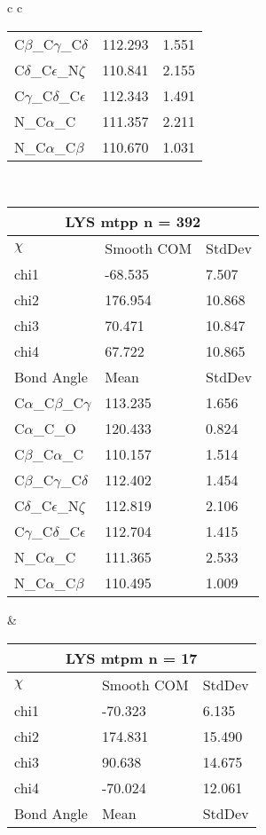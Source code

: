 \begin{longtable}{ c c }
\begin{tabular}{ l l l }
  C$\beta$\_C$\gamma$\_C$\delta$ & 112.293 & 1.551\\
  C$\delta$\_C$\epsilon$\_N$\zeta$ & 110.841 & 2.155\\
  C$\gamma$\_C$\delta$\_C$\epsilon$ & 112.343 & 1.491\\
  N\_C$\alpha$\_C & 111.357 & 2.211\\
  N\_C$\alpha$\_C$\beta$ & 110.670 & 1.031\\
  \bottomrule
  \end{tabular}
  \\
  \begin{tabular}{ l l l }
  \toprule
  \multicolumn{3}{c}{LYS \textbf{mtpp} n = 392} \\ \toprule
  $\chi$       & Smooth COM & StdDev \\ \midrule
  chi1 & -68.535 & 7.507 \\ 
  chi2 & 176.954 & 10.868 \\ 
  chi3 & 70.471 & 10.847 \\ 
  chi4 & 67.722 & 10.865 \\ \midrule
  Bond Angle   & Mean     & StdDev \\ \midrule
  C$\alpha$\_C$\beta$\_C$\gamma$ & 113.235 & 1.656\\
  C$\alpha$\_C\_O & 120.433 & 0.824\\
  C$\beta$\_C$\alpha$\_C & 110.157 & 1.514\\
  C$\beta$\_C$\gamma$\_C$\delta$ & 112.402 & 1.454\\
  C$\delta$\_C$\epsilon$\_N$\zeta$ & 112.819 & 2.106\\
  C$\gamma$\_C$\delta$\_C$\epsilon$ & 112.704 & 1.415\\
  N\_C$\alpha$\_C & 111.365 & 2.533\\
  N\_C$\alpha$\_C$\beta$ & 110.495 & 1.009\\
  \bottomrule
  \end{tabular}
  &
  \begin{tabular}{ l l l }
  \toprule
  \multicolumn{3}{c}{LYS \textbf{mtpm} n = 17} \\ \toprule
  $\chi$       & Smooth COM & StdDev \\ \midrule
  chi1 & -70.323 & 6.135 \\ 
  chi2 & 174.831 & 15.490 \\ 
  chi3 & 90.638 & 14.675 \\ 
  chi4 & -70.024 & 12.061 \\ \midrule
  Bond Angle   & Mean     & StdDev \\ \midrule

\end{tabular}
\end{longtable}
